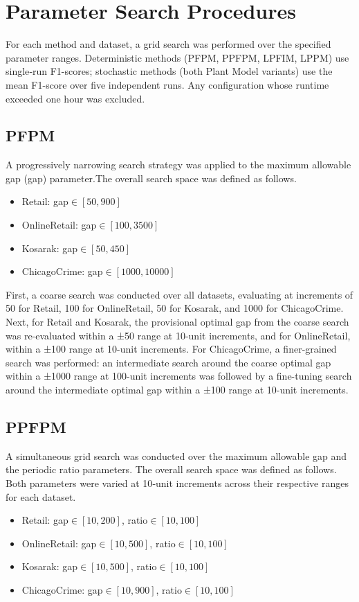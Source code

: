 \appendices
\section{Parameter Search Procedures}
\label{sec:params_space}
For each method and dataset, a grid search was performed over the specified parameter ranges. Deterministic methods (PFPM, PPFPM, LPFIM, LPPM) use single‐run F1-scores; stochastic methods (both Plant Model variants) use the mean F1-score over five independent runs. Any configuration whose runtime exceeded one hour was excluded.

\subsection{PFPM}
A progressively narrowing search strategy was applied to the maximum allowable gap (gap) parameter.The overall search space was defined as follows.

\begin{itemize}
  \item Retail: gap\(\in[50,900]\)
  \item OnlineRetail: gap\(\in[100,3500]\)
  \item Kosarak: gap\(\in[50,450]\)
  \item ChicagoCrime: gap\(\in[1000,10000]\)
\end{itemize}

First, a coarse search was conducted over all datasets, evaluating at increments of 50 for Retail, 100 for OnlineRetail, 50 for Kosarak, and 1000 for ChicagoCrime. Next, for Retail and Kosarak, the provisional optimal gap from the coarse search was re-evaluated within a ±50 range at 10-unit increments, and for OnlineRetail, within a ±100 range at 10-unit increments. For ChicagoCrime, a finer-grained search was performed: an intermediate search around the coarse optimal gap within a ±1000 range at 100-unit increments was followed by a fine-tuning search around the intermediate optimal gap within a ±100 range at 10-unit increments.


\subsection{PPFPM}
A simultaneous grid search was conducted over the maximum allowable gap and the periodic ratio parameters. The overall search space was defined as follows.
Both parameters were varied at 10‑unit increments across their respective ranges for each dataset.

\begin{itemize}
  \item Retail: gap\(\in[10,200]\), ratio\(\in[10,100]\)
  \item OnlineRetail: gap\(\in[10, 500]\), ratio\(\in[10,100]\)
  \item Kosarak: gap\(\in[10,500]\), ratio\(\in[10,100]\)
  \item ChicagoCrime: gap\(\in[10,900]\), ratio\(\in[10,100]\)
\end{itemize}


